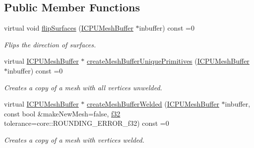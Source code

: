 \subsection*{Public Member Functions}
\begin{DoxyCompactItemize}
\item 
virtual void \hyperlink{classirr_1_1scene_1_1IMeshManipulator_a96bb33f5d55951912cac9a5cfd4b8289}{flip\+Surfaces} (\hyperlink{classirr_1_1scene_1_1ICPUMeshBuffer}{I\+C\+P\+U\+Mesh\+Buffer} $\ast$inbuffer) const  =0
\begin{DoxyCompactList}\small\item\em Flips the direction of surfaces. \end{DoxyCompactList}\item 
virtual \hyperlink{classirr_1_1scene_1_1ICPUMeshBuffer}{I\+C\+P\+U\+Mesh\+Buffer} $\ast$ \hyperlink{classirr_1_1scene_1_1IMeshManipulator_abd33bc1018923b33094e020ae05a0b4f}{create\+Mesh\+Buffer\+Unique\+Primitives} (\hyperlink{classirr_1_1scene_1_1ICPUMeshBuffer}{I\+C\+P\+U\+Mesh\+Buffer} $\ast$inbuffer) const  =0
\begin{DoxyCompactList}\small\item\em Creates a copy of a mesh with all vertices unwelded. \end{DoxyCompactList}\item 
virtual \hyperlink{classirr_1_1scene_1_1ICPUMeshBuffer}{I\+C\+P\+U\+Mesh\+Buffer} $\ast$ \hyperlink{classirr_1_1scene_1_1IMeshManipulator_aeec0af71135b6ec27e139da2e0d5b070}{create\+Mesh\+Buffer\+Welded} (\hyperlink{classirr_1_1scene_1_1ICPUMeshBuffer}{I\+C\+P\+U\+Mesh\+Buffer} $\ast$inbuffer, const bool \&make\+New\+Mesh=false, \hyperlink{namespaceirr_a0277be98d67dc26ff93b1a6a1d086b07}{f32} tolerance=core\+::\+R\+O\+U\+N\+D\+I\+N\+G\+\_\+\+E\+R\+R\+O\+R\+\_\+f32) const  =0
\begin{DoxyCompactList}\small\item\em Creates a copy of a mesh with vertices welded. \end{DoxyCompactList}\end{DoxyCompactItemize}
